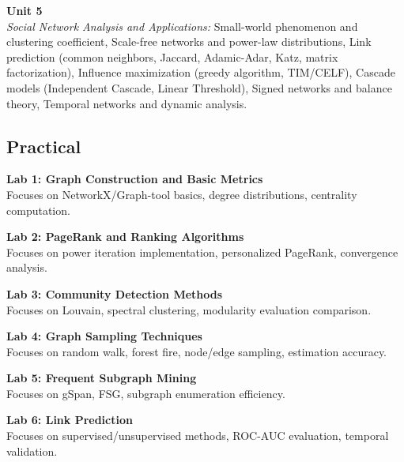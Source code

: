 \vspace{0.3cm}

\noindent\textbf{Unit 5} \\
\textit{Social Network Analysis and Applications:} Small-world phenomenon and clustering coefficient, Scale-free networks and power-law distributions, Link prediction (common neighbors, Jaccard, Adamic-Adar, Katz, matrix factorization), Influence maximization (greedy algorithm, TIM/CELF), Cascade models (Independent Cascade, Linear Threshold), Signed networks and balance theory, Temporal networks and dynamic analysis.

\newpage

\subsection*{Practical}
\noindent\textbf{Lab 1: Graph Construction and Basic Metrics} \\
Focuses on NetworkX/Graph-tool basics, degree distributions, centrality computation.

\vspace{0.2cm}

\noindent\textbf{Lab 2: PageRank and Ranking Algorithms} \\
Focuses on power iteration implementation, personalized PageRank, convergence analysis.

\vspace{0.2cm}

\noindent\textbf{Lab 3: Community Detection Methods} \\
Focuses on Louvain, spectral clustering, modularity evaluation comparison.

\vspace{0.2cm}

\noindent\textbf{Lab 4: Graph Sampling Techniques} \\
Focuses on random walk, forest fire, node/edge sampling, estimation accuracy.

\vspace{0.2cm}

\noindent\textbf{Lab 5: Frequent Subgraph Mining} \\
Focuses on gSpan, FSG, subgraph enumeration efficiency.

\vspace{0.2cm}

\noindent\textbf{Lab 6: Link Prediction} \\
Focuses on supervised/unsupervised methods, ROC-AUC evaluation, temporal validation.

